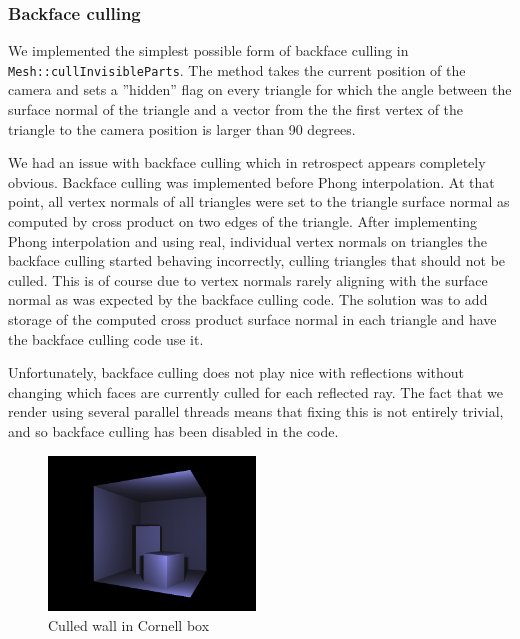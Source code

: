 \documentclass[a4paper,11pt]{article}
\begin{document}
\subsubsection{Backface culling}
We implemented the simplest possible form of backface culling in \texttt{Mesh::cullInvisibleParts}.
The method takes the current position of the camera and sets a ''hidden'' flag on every
triangle for which the angle between the surface normal of the triangle and a vector
from the the first vertex of the triangle to the camera position is larger than 90 degrees.

We had an issue with backface culling which in retrospect appears completely obvious.
Backface culling was implemented before Phong interpolation. At that point, all vertex
normals of all triangles were set to the triangle surface normal as computed by cross product
on two edges of the triangle. After implementing Phong interpolation and using real, individual
vertex normals on triangles the backface culling started behaving incorrectly, culling 
triangles that should not be culled. This is of course due to vertex normals rarely aligning
with the surface normal as was expected by the backface culling code. The solution was 
to add storage of the computed cross product surface normal in each triangle and have the
backface culling code use it.

Unfortunately, backface culling does not play nice with reflections without changing which faces
are currently culled for each reflected ray. The fact that we render using several parallel
threads means that fixing this is not entirely trivial, and so backface culling has been disabled
in the code.

\begin{figure}[H]
\begin{center}
\includegraphics[width=5.5cm]{bfcull.png}
\caption{Culled wall in Cornell box}
\end{center}
\end{figure}
\vspace{-0.5cm}
\end{document}
